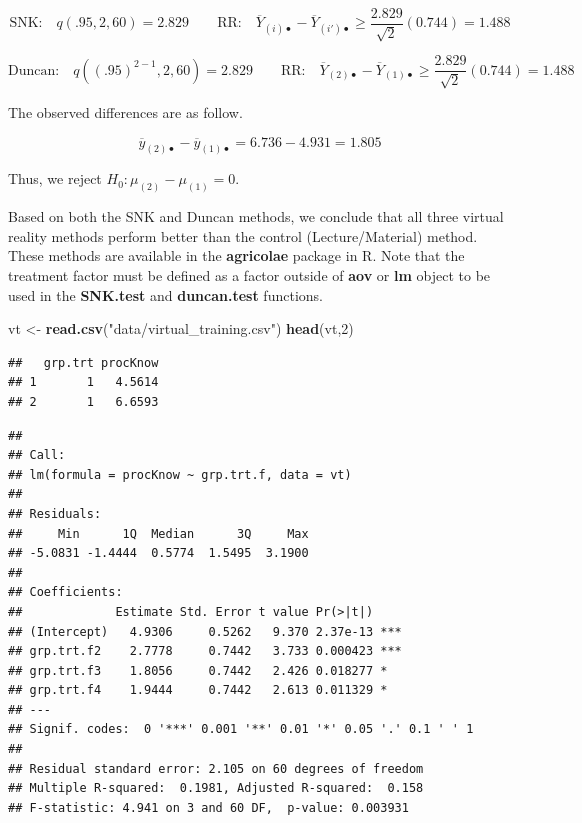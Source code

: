 \documentclass[
]{book}
\newenvironment{Shaded}{\begin{snugshade}}{\end{snugshade}}
\newcommand{\AttributeTok}[1]{\textcolor[rgb]{0.13,0.29,0.53}{#1}}
\newcommand{\DecValTok}[1]{\textcolor[rgb]{0.00,0.00,0.81}{#1}}
\newcommand{\FunctionTok}[1]{\textcolor[rgb]{0.13,0.29,0.53}{\textbf{#1}}}
\newcommand{\NormalTok}[1]{#1}
\newcommand{\OtherTok}[1]{\textcolor[rgb]{0.56,0.35,0.01}{#1}}
\newcommand{\SpecialCharTok}[1]{\textcolor[rgb]{0.81,0.36,0.00}{\textbf{#1}}}
\newcommand{\StringTok}[1]{\textcolor[rgb]{0.31,0.60,0.02}{#1}}
\begin{document}
\[
\mbox{SNK:} \quad q(.95,2,60)=2.829   \qquad \mbox{RR:} \quad
\overline{Y}_{(i)\bullet}- \overline{Y}_{(i')\bullet} \ge
\frac{2.829}{\sqrt{2}}(0.744)=1.488
\]

\[
\mbox{Duncan:} \quad q((.95)^{2-1},2,60)=2.829   \qquad \mbox{RR:} \quad
\overline{Y}_{(2)\bullet}- \overline{Y}_{(1)\bullet} \ge
\frac{2.829}{\sqrt{2}}(0.744)=1.488
\]

The observed differences are as follow.

\[
\overline{y}_{(2)\bullet}- \overline{y}_{(1)\bullet}=6.736-4.931=1.805
\]

Thus, we reject \(H_0:\mu_{(2)}-\mu_{(1)}=0\).

Based on both the SNK and Duncan methods, we conclude that all three
virtual reality methods perform better than the control
(Lecture/Material) method. These methods are available in the
\textbf{agricolae} package in R. Note that the treatment factor must be
defined as a factor outside of \textbf{aov} or \textbf{lm} object to be
used in the \textbf{SNK.test} and \textbf{duncan.test} functions.

\begin{Shaded}
\begin{Highlighting}[]
\NormalTok{vt }\OtherTok{\textless{}{-}} \FunctionTok{read.csv}\NormalTok{(}\StringTok{"data/virtual\_training.csv"}\NormalTok{)}
\FunctionTok{head}\NormalTok{(vt,}\DecValTok{2}\NormalTok{)}
\end{Highlighting}
\end{Shaded}

\begin{verbatim}
##   grp.trt procKnow
## 1       1   4.5614
## 2       1   6.6593
\end{verbatim}

\begin{Shaded}
\end{Shaded}

\begin{verbatim}
## 
## Call:
## lm(formula = procKnow ~ grp.trt.f, data = vt)
## 
## Residuals:
##     Min      1Q  Median      3Q     Max 
## -5.0831 -1.4444  0.5774  1.5495  3.1900 
## 
## Coefficients:
##             Estimate Std. Error t value Pr(>|t|)    
## (Intercept)   4.9306     0.5262   9.370 2.37e-13 ***
## grp.trt.f2    2.7778     0.7442   3.733 0.000423 ***
## grp.trt.f3    1.8056     0.7442   2.426 0.018277 *  
## grp.trt.f4    1.9444     0.7442   2.613 0.011329 *  
## ---
## Signif. codes:  0 '***' 0.001 '**' 0.01 '*' 0.05 '.' 0.1 ' ' 1
## 
## Residual standard error: 2.105 on 60 degrees of freedom
## Multiple R-squared:  0.1981, Adjusted R-squared:  0.158 
## F-statistic: 4.941 on 3 and 60 DF,  p-value: 0.003931
\end{verbatim}
\end{document}
